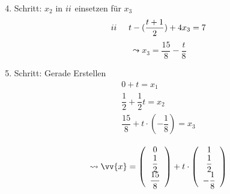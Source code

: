 \documentclass[a4paper, 15pt]{article}
\newcommand{\uproman}[1]{\uppercase\expandafter{\romannumeral#1}}
\begin{document}
\begin{minipage}{.49\textwidth}
\begin{enumerate}
\setcounter{enumi}{3}
\item Schritt: $x_2$ in $\uproman{2}$ einsetzen für $x_3$\newline
\begin{equation*}
\uproman{2} \hspace{0.5cm} t-(\dfrac{t+1}{2})+4x_3=7
\end{equation*}
\begin{equation*}
\leadsto x_3 = \dfrac{15}{8}-\dfrac{t}{8}
\end{equation*}
\item Schritt: Gerade Erstellen\newline
\begin{align*}
 0+t = x_1 \\
 \dfrac{1}{2} + \dfrac{1}{2}t = x_2 \\
 \dfrac{15}{8}+t\cdot (-\dfrac{1}{8}) = x_3 \\
\end{align*}
\begin{equation*}
\leadsto \vv{x} = \left(\begin{array}{c} 0 \\ \dfrac{1}{2} \\ \dfrac{15}{8} \end{array}\right)+t\cdot \left(\begin{array}{c} 1 \\ \dfrac{1}{2} \\ -\dfrac{1}{8} \end{array}\right)
\end{equation*}
\end{enumerate}
\end{minipage}
\end{document}
